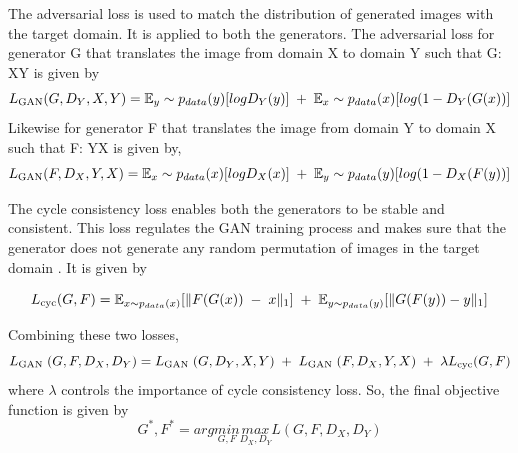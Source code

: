 	The adversarial loss is used to match the distribution of generated images with the target domain. It is applied to both the generators. The adversarial loss \citep{CycleGAN2017} for generator G that translates the image from domain X to domain Y such that G: X\textrightarrow Y is given by
\begin{equation*}
L\textsubscript{GAN} (G,D_Y,X,Y)=\mathbb{E}_y\sim p_{data}(y)[log D_Y(y)] \; + \; \mathbb{E}_x\sim p_{data}(x)[log(1-D_Y(G(x))]
\end{equation*}
Likewise for generator F that translates the image from domain Y to domain X such that F: Y\textrightarrow X is given by,
\begin{equation*}
L\textsubscript{GAN}(F,D_X,Y,X)=\mathbb{E}_x\sim p_{data}(x)[log D_X(x)] \; + \; \mathbb{E}_y\sim p_{data}(y)[log(1-D_X(F(y))]
\end{equation*}

The cycle consistency loss enables both the generators to be stable and consistent. This loss regulates the GAN training process and makes sure that the generator does not generate any random permutation of images in the target domain \citep{CycleGAN2017}. It is given by

\begin{equation*}
L\textsubscript{cyc}(G,F)=\mathbb{E}_{x\sim p_{data}(x)}[\lVert F(G(x)) \; - \; x \rVert_1] \; + \; \mathbb{E}_{y\sim p_{data}(y)}[\lVert G(F(y)) - y \rVert_1]
\end{equation*}

Combining these two losses, 	
\begin{equation*}
L\textsubscript{GAN}\;(G,F,D_X,D_Y) = L\textsubscript{GAN}\;(G,D_Y,X,Y) \;+ \;L\textsubscript{GAN}\;(F,D_X,Y,X) \;+\; \lambda L\textsubscript{cyc}(G,F)
\end{equation*}
where $\lambda$ controls the importance of cycle consistency loss. So, the final objective function \citep{CycleGAN2017} is given by
\begin{equation*}
G^*,F^*=arg\underset{G,F}{min}\underset{D_X,D_Y}{max}L(G,F,D_X,D_Y)
\end{equation*}


